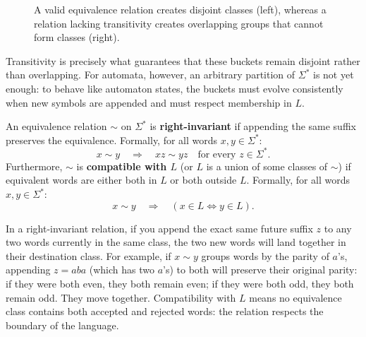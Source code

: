 \begin{figure}[ht]
\caption{A valid equivalence relation creates disjoint classes (left), whereas a relation lacking transitivity creates overlapping groups that cannot form classes (right).}
\label{fig:equivalence-classes-examples}
\end{figure}

Transitivity is precisely what guarantees that these buckets remain disjoint rather than overlapping. For automata, however, an arbitrary partition of $\Sigma^*$ is not yet enough: to behave like automaton states, the buckets must evolve consistently when new symbols are appended and must respect membership in $L$.

\begin{definition}
\label{def:right-invariant-equivalence}
An equivalence relation $\sim$ on $\Sigma^*$ is \textbf{right-invariant} if appending the same suffix preserves the equivalence. Formally, for all words $x, y \in \Sigma^*$:
\[
  x \sim y \quad\Longrightarrow\quad xz \sim yz
  \quad\text{for every }z\in\Sigma^*.
\]
Furthermore, $\sim$ is \textbf{compatible with $L$} (or $L$ is a union of some classes of $\sim$) if equivalent words are either both in $L$ or both outside $L$. Formally, for all words $x, y \in \Sigma^*$:
\[
  x \sim y \quad\Longrightarrow\quad (x \in L \Longleftrightarrow y \in L).
\]
\end{definition}

In a right-invariant relation, if you append the exact same future suffix $z$ to any two words currently in the same class, the two new words will land together in their destination class. For example, if $x \sim y$ groups words by the parity of $a$'s, appending $z = aba$ (which has two $a$'s) to both will preserve their original parity: if they were both even, they both remain even; if they were both odd, they both remain odd. They move together. Compatibility with $L$ means no equivalence class contains both accepted and rejected words: the relation respects the boundary of the language.

